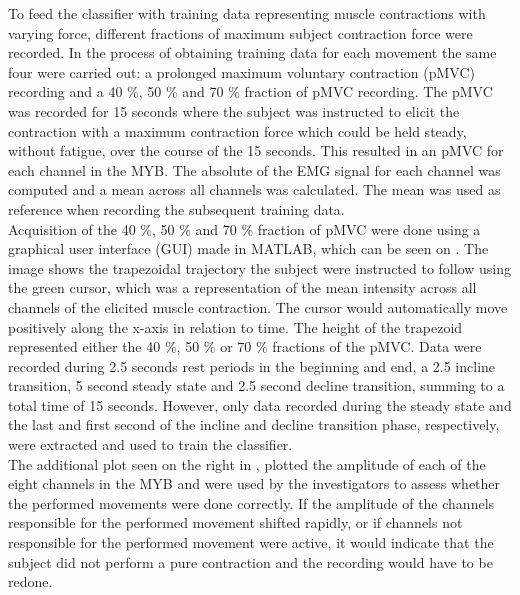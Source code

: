 To feed the classifier with training data representing muscle contractions with varying force, different fractions of maximum subject contraction force were recorded. In the process of obtaining training data for each movement the same four were carried out: a prolonged maximum voluntary contraction (pMVC) recording and a 40 $\percent$, 50 $\percent$ and 70 $\percent$ fraction of pMVC recording.
The pMVC was recorded for 15 seconds where the subject was instructed to elicit the contraction with a maximum contraction force which could be held steady, without fatigue, over the course of the 15 seconds. This resulted in an pMVC for each channel in the MYB. The absolute of the EMG signal for each channel was computed and a mean across all channels was calculated. The mean was used as reference when recording the subsequent training data. \\
Acquisition of the 40 $\percent$, 50 $\percent$ and 70 $\percent$ fraction of pMVC were done using a graphical user interface (GUI) made in MATLAB, which can be seen on . The image shows the trapezoidal trajectory the subject were instructed to follow using the green cursor, which was a representation of the mean intensity across all channels of the elicited muscle contraction. The cursor would automatically move positively along the x-axis in relation to time. The height of the trapezoid represented either the 40 $\percent$, 50 $\percent$ or 70 $\percent$ fractions of the pMVC. Data were recorded during 2.5 seconds rest periods in the beginning and end, a 2.5 incline transition, 5 second steady state and 2.5 second decline transition, summing to a total time of 15 seconds. However, only data recorded during the steady state and the last and first second of the incline and decline transition phase, respectively, were extracted and used to train the classifier. \\
The additional plot seen on the right in , plotted the amplitude of each of the eight channels in the MYB and were used by the investigators to assess whether the performed movements were done correctly. If the amplitude of the channels responsible for the performed movement shifted rapidly, or if channels not responsible for the performed movement were active, it would indicate that the subject did not perform a pure contraction and the recording would have to be redone.   
   
   
